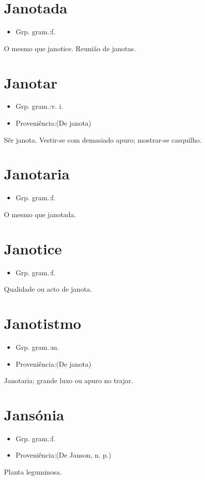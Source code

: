 \documentclass{article}
\begin{document}
\section{Janotada}
\begin{itemize}
\item {Grp. gram.:f.}
\end{itemize}
O mesmo que \textunderscore janotice\textunderscore . Reunião de janotas.
\section{Janotar}
\begin{itemize}
\item {Grp. gram.:v. i.}
\end{itemize}
\begin{itemize}
\item {Proveniência:(De \textunderscore janota\textunderscore )}
\end{itemize}
Sêr janota.
Vestir-se com demasiado apuro; mostrar-se casquilho.
\section{Janotaria}
\begin{itemize}
\item {Grp. gram.:f.}
\end{itemize}
O mesmo que \textunderscore janotada\textunderscore .
\section{Janotice}
\begin{itemize}
\item {Grp. gram.:f.}
\end{itemize}
Qualidade ou acto de janota.
\section{Janotistmo}
\begin{itemize}
\item {Grp. gram.:m.}
\end{itemize}
\begin{itemize}
\item {Proveniência:(De \textunderscore janota\textunderscore )}
\end{itemize}
Janotaria; grande luxo ou apuro no trajar.
\section{Jansónia}
\begin{itemize}
\item {Grp. gram.:f.}
\end{itemize}
\begin{itemize}
\item {Proveniência:(De \textunderscore Janson\textunderscore , n. p.)}
\end{itemize}
Planta leguminosa.
\end{document}
